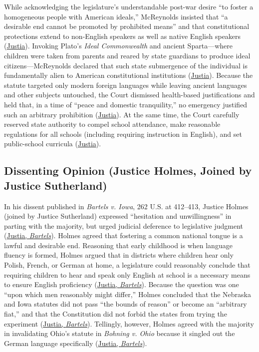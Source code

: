 \documentclass[12pt]{article}
\begin{document}
While acknowledging the legislature's understandable post-war desire ``to foster a homogeneous people with American ideals,'' McReynolds insisted that ``a desirable end cannot be promoted by prohibited means'' and that constitutional protections extend to non-English speakers as well as native English speakers (\href{https://supreme.justia.com/cases/federal/us/262/390/}{Justia}). Invoking Plato's \textit{Ideal Commonwealth} and ancient Sparta---where children were taken from parents and reared by state guardians to produce ideal citizens---McReynolds declared that such state submergence of the individual is fundamentally alien to American constitutional institutions (\href{https://supreme.justia.com/cases/federal/us/262/390/}{Justia}). Because the statute targeted only modern foreign languages while leaving ancient languages and other subjects untouched, the Court dismissed health-based justifications and held that, in a time of ``peace and domestic tranquility,'' no emergency justified such an arbitrary prohibition (\href{https://supreme.justia.com/cases/federal/us/262/390/}{Justia}). At the same time, the Court carefully reserved state authority to compel school attendance, make reasonable regulations for all schools (including requiring instruction in English), and set public-school curricula (\href{https://supreme.justia.com/cases/federal/us/262/390/}{Justia}).

\subsection{Dissenting Opinion (Justice Holmes, Joined by Justice Sutherland)}

In his dissent published in \textit{Bartels v. Iowa}, 262 U.S. at 412--413, Justice Holmes (joined by Justice Sutherland) expressed ``hesitation and unwillingness'' in parting with the majority, but urged judicial deference to legislative judgment (\href{https://supreme.justia.com/cases/federal/us/262/404/}{Justia, \textit{Bartels}}). Holmes agreed that fostering a common national tongue is a lawful and desirable end. Reasoning that early childhood is when language fluency is formed, Holmes argued that in districts where children hear only Polish, French, or German at home, a legislature could reasonably conclude that requiring children to hear and speak only English at school is a necessary means to ensure English proficiency (\href{https://supreme.justia.com/cases/federal/us/262/404/}{Justia, \textit{Bartels}}). Because the question was one ``upon which men reasonably might differ,'' Holmes concluded that the Nebraska and Iowa statutes did not pass ``the bounds of reason'' or become an ``arbitrary fiat,'' and that the Constitution did not forbid the states from trying the experiment (\href{https://supreme.justia.com/cases/federal/us/262/404/}{Justia, \textit{Bartels}}). Tellingly, however, Holmes agreed with the majority in invalidating Ohio's statute in \textit{Bohning v. Ohio} because it singled out the German language specifically (\href{https://supreme.justia.com/cases/federal/us/262/404/}{Justia, \textit{Bartels}}).
\end{document}
